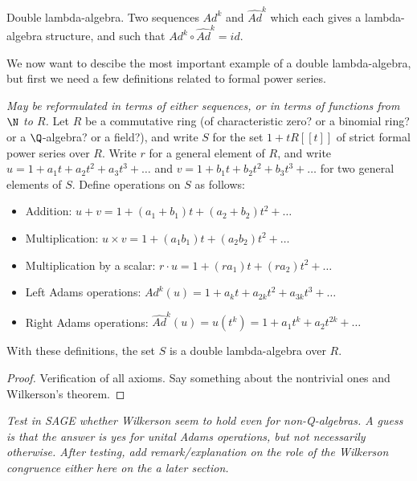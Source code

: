 \documentclass[a4paper]{article}
\begin{document}
 

\begin{definition}
Double lambda-algebra. Two sequences $Ad^k$ and $\widehat{Ad}^k$ which each gives a lambda-algebra structure, and such that $Ad^k \circ \widehat{Ad}^k = id$.
\end{definition}

We now want to descibe the most important example of a double lambda-algebra, but first we need a few definitions related to formal power series.



\begin{proposition}
\emph{May be reformulated in terms of either sequences, or in terms of functions from $\N$ to $R$.}
Let $R$ be a commutative ring (of characteristic zero? or a binomial ring? or a $\Q$-algebra? or a field?), and write $S$ for the set $1+t R[[t]]$ of strict formal power series over $R$. Write $r$ for a general element of $R$, and write $u = 1+a_1 t + a_2 t^2 + a_3 t^3 + \ldots$ and $v = 1+b_1 t + b_2 t^2 + b_3 t^3 + \ldots$ for two general elements of $S$. Define operations on $S$ as follows:
\begin{itemize}
\item Addition: $u+v = 1+ (a_1 + b_1) t + (a_2 + b_2) t^2 + \ldots $
\item Multiplication: $u \times v = 1+ (a_1 b_1) t + (a_2  b_2) t^2 + \ldots$
\item Multiplication by a scalar: $r \cdot u = 1+ (r a_1 ) t + (r a_2 ) t^2 + \ldots$
\item Left Adams operations: $Ad^k(u) = 1 + a_k t + a_{2k} t^2 + a_{3k} t^3 + \ldots$
\item Right Adams operations: $\hat{Ad}^k(u) = u (t^k) = 1+a_1 t^k + a_2 t^{2k} + \ldots$
\end{itemize}
With these definitions, the set $S$ is a double lambda-algebra over $R$.
\end{proposition}

\begin{proof}
Verification of all axioms. Say something about the nontrivial ones and Wilkerson's theorem.
\end{proof}

\emph{Test in SAGE whether Wilkerson seem to hold even for non-Q-algebras. A guess is that the answer is yes for unital Adams operations, but not necessarily otherwise. After testing, add remark/explanation on the role of the Wilkerson congruence either here on the a later section.}
\end{document}
